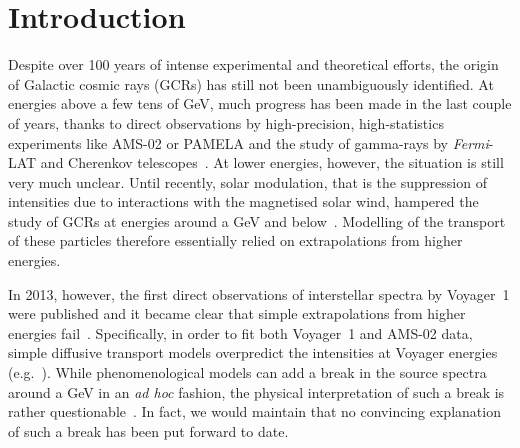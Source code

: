 \documentclass[%
reprint,
amsmath,amssymb,
aps,
superscriptaddress,
preprintnumbers
]{revtex4-2}
\begin{document}
\maketitle


\section{Introduction}
Despite over 100 years of intense experimental and theoretical efforts, the origin of Galactic cosmic rays (GCRs) has still not been unambiguously identified. At energies above a few tens of GeV, much progress has been made in the last couple of years, thanks to direct observations by high-precision, high-statistics experiments like AMS-02 or PAMELA and the study of gamma-rays by \textit{Fermi}-LAT and Cherenkov telescopes~\cite{gabici2019}. At lower energies, however, the situation is still very much unclear. Until recently, solar modulation, that is the suppression of intensities due to interactions with the magnetised solar wind, hampered the study of GCRs at energies around a GeV and below~\cite{potgieter2013}. Modelling of the transport of these particles therefore essentially relied on extrapolations from higher energies.

In 2013, however, the first direct observations of interstellar spectra by Voyager~1 were published and it became clear that simple extrapolations from higher energies fail~\cite{stone2013}. Specifically, in order to fit both Voyager~1 and \mbox{AMS-02} data, simple diffusive transport models overpredict the intensities at Voyager energies (e.g.~\cite{Vittino:2019yme}). While phenomenological models can add a break in the source spectra around a GeV in an \emph{ad hoc} fashion, the physical interpretation of such a break is rather questionable~\cite{cummings2016,orlando2018,boschini2018a,boschini2018b,johannesson2018,bisschoff2019}. In fact, we would maintain that no convincing explanation of such a break has been put forward to date.
\end{document}
